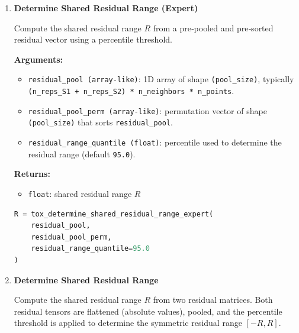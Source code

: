 \begin{enumerate}
        \begin{lstlisting}[language=Python, caption={Neighborhood Construction}]
out = tox_construct_neighborhoods(
    x_star,
    mean_S,
    resid_S,
    n_pool,
    desired_n_neighbors=0
)

neigh_res = out["neighborhood_residuals"]
neigh_idx = out["neighborhood_indices"]
        \end{lstlisting}

    \item \textbf{Determine Shared Residual Range (Expert)}

        Compute the shared residual range \(R\) from a pre‑pooled and pre‑sorted residual vector using a percentile threshold.

        \textbf{Arguments:}
        \begin{itemize}
            \item \lstinline!residual_pool (array-like)!: 1D array of shape \lstinline!(pool_size)!, typically \lstinline!(n_reps_S1 + n_reps_S2) * n_neighbors * n_points!.
            \item \lstinline!residual_pool_perm (array-like)!: permutation vector of shape \lstinline!(pool_size)! that sorts \lstinline!residual_pool!.
            \item \lstinline!residual_range_quantile (float)!: percentile used to determine the residual range (default \lstinline!95.0!).
        \end{itemize}

        \textbf{Returns:}
        \begin{itemize}
            \item \lstinline!float!: shared residual range \(R\)
        \end{itemize}

        \begin{lstlisting}[language=Python, caption={Shared Residual Range (Expert)}]
R = tox_determine_shared_residual_range_expert(
    residual_pool,
    residual_pool_perm,
    residual_range_quantile=95.0
)
        \end{lstlisting}
 
    \item \textbf{Determine Shared Residual Range}

        Compute the shared residual range \(R\) from two residual matrices.  
        Both residual tensors are flattened (absolute values), pooled, and the percentile threshold is applied to determine the symmetric residual range \([-R, R]\).


\end{enumerate}
